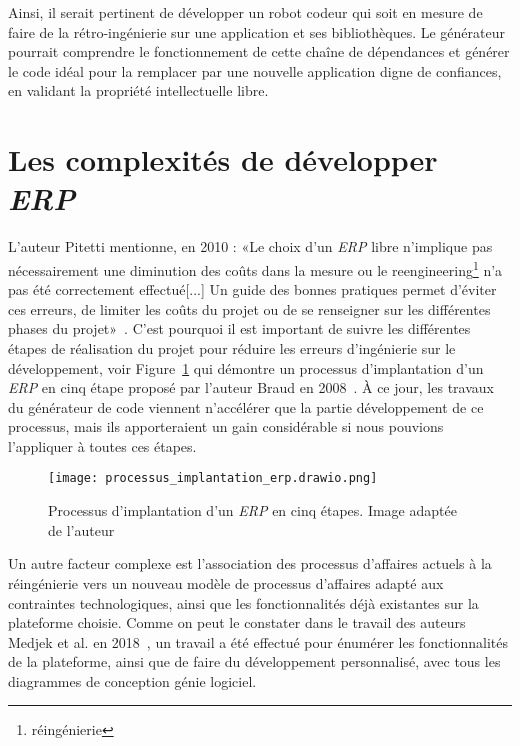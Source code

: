 Ainsi, il serait pertinent de développer un robot codeur qui soit en mesure de faire de la rétro-ingénierie sur une application et ses bibliothèques. Le générateur pourrait comprendre le fonctionnement de cette chaîne de dépendances et générer le code idéal pour la remplacer par une nouvelle application digne de confiances, en validant la propriété intellectuelle libre.

\section{Les complexités de développer \textit{ERP}}

L'auteur Pitetti mentionne, en 2010 : «Le choix d’un \textit{ERP} libre n’implique pas nécessairement une diminution des coûts dans la mesure ou le reengineering\footnote{réingénierie} n’a pas été correctement effectué[...] Un guide des bonnes pratiques permet d’éviter ces erreurs, de limiter les coûts du projet ou de se renseigner sur les différentes phases du projet»~\cite{pitetti2010implementation}. C'est pourquoi il est important de suivre les différentes étapes de réalisation du projet pour réduire les erreurs d'ingénierie sur le développement, voir Figure~\ref{fig:erp_implantation_cinq_etape} qui démontre un processus d'implantation d'un \textit{ERP} en cinq étape proposé par l'auteur Braud en 2008~\cite{uqam_erp_benefice_2008}. À ce jour, les travaux du générateur de code viennent n'accélérer que la partie développement de ce processus, mais ils apporteraient un gain considérable si nous pouvions l'appliquer à toutes ces étapes.

\begin{figure}[htb]
\centering
\texttt{[image: processus\_implantation\_erp.drawio.png]}
\caption{Processus d'implantation d'un \textit{ERP} en cinq étapes. Image adaptée de l'auteur~\cite{uqam_erp_benefice_2008}}
\label{fig:erp_implantation_cinq_etape}
\end{figure}


Un autre facteur complexe est l'association des processus d'affaires actuels à la réingénierie vers un nouveau modèle de processus d'affaires adapté aux contraintes technologiques, ainsi que les fonctionnalités déjà existantes sur la plateforme choisie. Comme on peut le constater dans le travail des auteurs Medjek et al. en 2018~\cite{kenza2018conception}, un travail a été effectué pour énumérer les fonctionnalités de la plateforme, ainsi que de faire du développement personnalisé, avec tous les diagrammes de conception génie logiciel.

